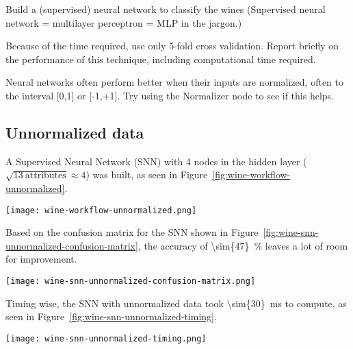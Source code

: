 \documentclass[
  coursecode={CMPE 251},
  assignmentname={Exercise \exercisenumber},
  studentnumber=20053722,
  name={Bryan Hoang},
  final,
]{
  ltxanswer%
}
\begin{document}
  \begin{questions}
    \question[2]{}
    Build a (supervised) neural network to classify the wines (Supervised neural network = multilayer perceptron = MLP in the jargon.)

    Because of the time required, use only 5-fold cross validation. Report briefly on the performance of this technique, including computational time required.

    Neural networks often perform better when their inputs are normalized, often to the interval [0,1] or [-1,+1]. Try using the Normalizer node to see if this helps.
    \begin{solution}
      \section*{Unnormalized data}
      A Supervised Neural Network (SNN) with 4 nodes in the hidden layer (\(\sqrt{13\ \text{attributes}} \approx 4\)) was built, as seen in Figure~\ref{fig:wine-workflow-unnormalized}.

      \begin{answerfigure}
        \texttt{[image: wine-workflow-unnormalized.png]}
        \label{fig:wine-workflow-unnormalized}
      \end{answerfigure}

      Based on the confusion matrix for the SNN shown in Figure~\ref{fig:wine-snn-unnormalized-confusion-matrix}, the accuracy of \qty{\sim{47}}{\percent} leaves a lot of room for improvement.

      \newpage

      \begin{answerfigure}
        \texttt{[image: wine-snn-unnormalized-confusion-matrix.png]}
        \label{fig:wine-snn-unnormalized-confusion-matrix}
      \end{answerfigure}

      Timing wise, the SNN with unnormalized data took \qty{\sim{30}}{\ms} to compute, as seen in Figure~\ref{fig:wine-snn-unnormalized-timing}.

      \begin{answerfigure}
        \texttt{[image: wine-snn-unnormalized-timing.png]}
        \label{fig:wine-snn-unnormalized-timing}
      \end{answerfigure}


\end{solution}
\end{questions}
\end{document}
